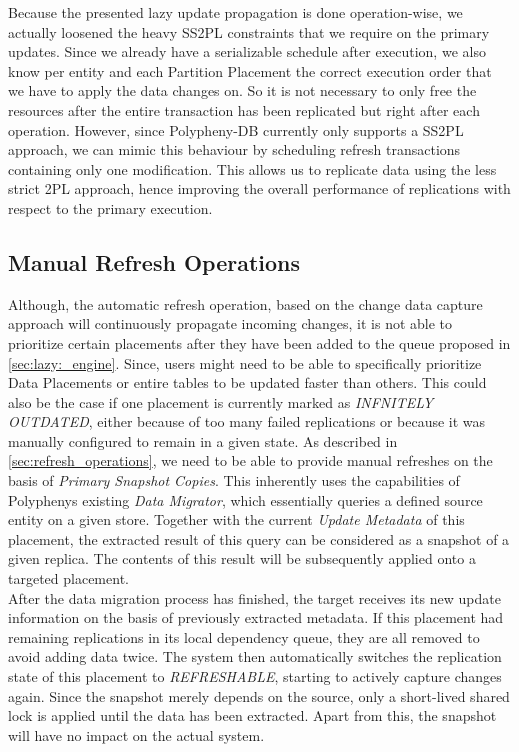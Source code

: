 Because the presented lazy update propagation is done operation-wise, we actually loosened the heavy SS2PL constraints that we require on the primary updates. 
Since we already have a serializable schedule after execution, we also know per entity and each Partition Placement 
the correct execution order that we have to apply the data changes on. So it is not necessary to only free the resources 
after the entire transaction has been replicated but right after each operation. 
However, since Polypheny-DB currently only supports a SS2PL approach, we can 
mimic this behaviour by scheduling refresh transactions containing only one modification.
This allows us to replicate data using the less strict 2PL approach, hence improving the overall performance of replications with respect to the primary execution.



\subsection{Manual Refresh Operations}
\label{sec:manual_refresh}

Although, the automatic refresh operation, based on the change data capture approach will continuously propagate incoming changes,
it is not able to prioritize certain placements after they have been added to the queue proposed in \ref{sec:lazy:_engine}.
Since, users might need to be able to specifically prioritize Data Placements or entire tables to be updated faster than others. 
This could also be the case if one placement is currently marked as \emph{INFNITELY OUTDATED},
either because of too many failed replications or because it was manually configured to remain in a given state. 
As described in \ref{sec:refresh_operations}, we need to be able to provide manual refreshes on the basis of \emph{Primary Snapshot Copies}.
This inherently uses the capabilities of Polyphenys existing \emph{Data Migrator}, which essentially queries a defined source entity on a given store. 
Together with the current \emph{Update Metadata} of this placement, the extracted result of this query can be considered as a snapshot of a given replica.
The contents of this result will be subsequently applied onto a targeted placement.\\
After the data migration process has finished, the target receives its new update information on the basis of previously extracted metadata.
If this placement had remaining replications in its local dependency queue, they are all removed to avoid adding data twice. 
The system then automatically switches the replication state of this placement to \emph{REFRESHABLE}, starting to actively capture changes again.
Since the snapshot merely depends on the source, only a short-lived shared lock is applied until the data has been extracted. Apart from this, the snapshot will have no impact
on the actual system.


